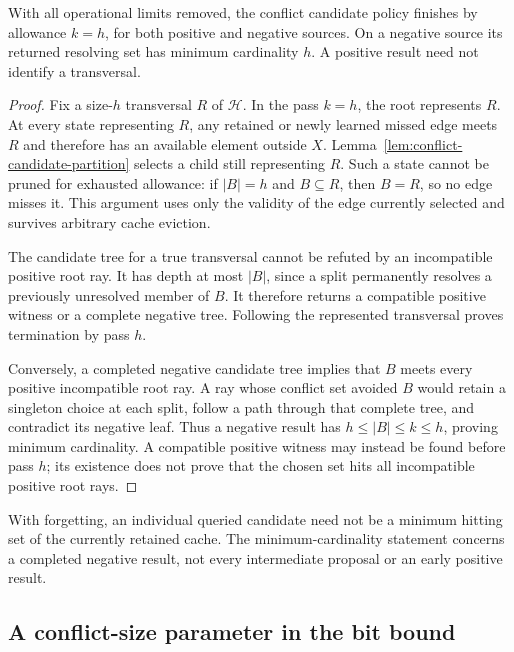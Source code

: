 \begin{proposition}
\label{prop:conflict-candidate-completion}
With all operational limits removed, the conflict candidate policy
finishes by allowance $k=h$, for both positive and negative sources.
On a negative source its returned resolving set has minimum cardinality
$h$.  A positive result need not identify a transversal.
\end{proposition}
\begin{proof}
Fix a size-$h$ transversal $R$ of $\mathcal H$.  In the pass $k=h$,
the root represents $R$.  At every state representing $R$, any retained
or newly learned missed edge meets $R$ and therefore has an available
element outside $X$.  Lemma~\ref{lem:conflict-candidate-partition}
selects a child still representing $R$.  Such a state cannot be pruned
for exhausted allowance: if $|B|=h$ and $B\subseteq R$, then $B=R$,
so no edge misses it.  This argument uses only the validity of the edge
currently selected and survives arbitrary cache eviction.

The candidate tree for a true transversal cannot be refuted by an
incompatible positive root ray.  It has depth at most $|B|$, since a
split permanently resolves a previously unresolved member of $B$.
It therefore returns a compatible positive witness or a complete
negative tree.  Following the represented transversal proves termination
by pass $h$.

Conversely, a completed negative candidate tree implies that $B$ meets
every positive incompatible root ray.  A ray whose conflict set avoided
$B$ would retain a singleton choice at each split, follow a path through
that complete tree, and contradict its negative leaf.  Thus a negative
result has $h\le|B|\le k\le h$, proving minimum cardinality.
A compatible positive witness may instead be found before pass $h$;
its existence does not prove that the chosen set hits all incompatible
positive root rays.
\end{proof}

With forgetting, an individual queried candidate need not be a minimum
hitting set of the currently retained cache.  The minimum-cardinality
statement concerns a completed negative result, not every intermediate
proposal or an early positive result.

\subsection{A conflict-size parameter in the bit bound}

